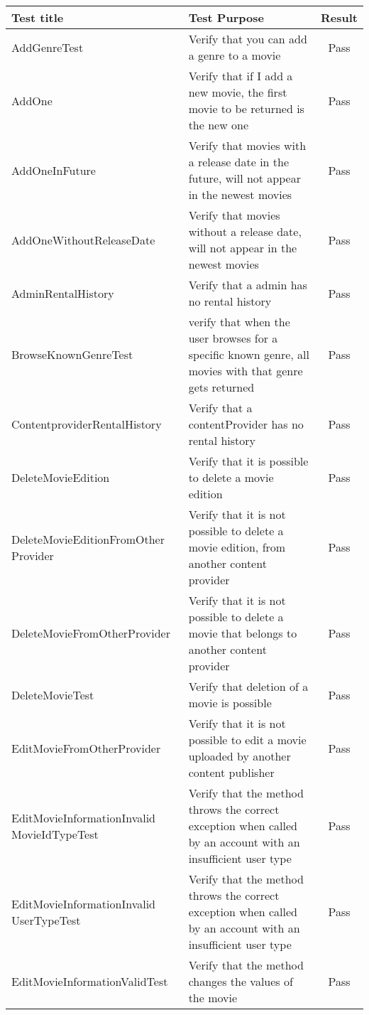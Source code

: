 \begin{centering}
\begin{longtable}{| p{5 cm} | p{9 cm} | c |}
\hline
Test title & Test Purpose & Result\\
\hline
AddGenreTest & Verify that you can add a genre to a movie & Pass\\
\hline
AddOne & Verify that if I add a new movie, the first movie to be returned is the new one & Pass\\
\hline
AddOneInFuture & Verify that movies with a release date in the future, will not appear in the newest movies & Pass\\
\hline
AddOneWithoutReleaseDate & Verify that movies without a release date, will not appear in the newest movies & Pass\\
\hline
AdminRentalHistory & Verify that a admin has no rental history & Pass\\
\hline
BrowseKnownGenreTest & verify that when the user browses for a specific known genre, all movies with that genre gets returned & Pass\\
\hline
ContentproviderRentalHistory & Verify that a contentProvider has no rental history & Pass\\
\hline
DeleteMovieEdition & Verify that it is possible to delete a movie edition & Pass\\
\hline
DeleteMovieEditionFromOther Provider & Verify that it is not possible to delete a movie edition, from another content provider & Pass\\
\hline
DeleteMovieFromOtherProvider & Verify that it is not possible to delete a movie that belongs to another content provider & Pass\\
\hline
DeleteMovieTest & Verify that deletion of a movie is possible & Pass\\
\hline
EditMovieFromOtherProvider & Verify that it is not possible to edit a movie uploaded by another content publisher & Pass\\
\hline
EditMovieInformationInvalid MovieIdTypeTest & Verify that the method throws the correct exception when called by an account with an insufficient user type & Pass\\
\hline
EditMovieInformationInvalid UserTypeTest & Verify that the method throws the correct exception when called by an account with an insufficient user type & Pass\\
\hline
EditMovieInformationValidTest & Verify that the method changes the values of the movie & Pass\\
\hline

\end{longtable}
\end{centering}
